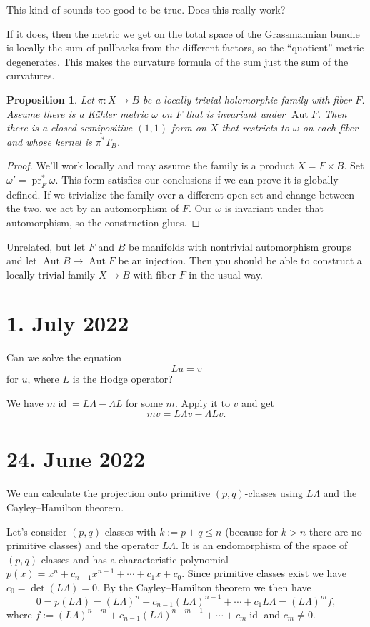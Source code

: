 \documentclass[11pt]{amsart}
\newtheorem{prop}[theo]{Proposition}
\theoremstyle{definition}
\DeclareMathOperator{\pr}{pr}
\DeclareMathOperator{\Aut}{Aut}
\DeclareMathOperator{\id}{id}
\begin{document}
This kind of sounds too good to be true. Does this really work?

If it does, then the metric we get on the total space of the Grassmannian bundle
is locally the sum of pullbacks from the different factors, so the ``quotient''
metric degenerates. This makes the curvature formula of the sum just the sum of
the curvatures.


\begin{prop}
Let $\pi : X \to B$ be a locally trivial holomorphic family with fiber $F$.
Assume there is a K\"ahler metric $\omega$ on $F$ that is invariant under $\Aut F$.
Then there is a closed semipositive $(1,1)$-form on $X$ that restricts to $\omega$ on each fiber and whose kernel is $\pi^*T_B$.
\end{prop}

\begin{proof}
We'll work locally and may assume the family is a product $X = F \times B$.
Set $\omega' = \pr_{F}^*\omega$.
This form satisfies our conclusions if we can prove it is globally defined.
If we trivialize the family over a different open set and change between the two, we act by an automorphism of $F$.
Our $\omega$ is invariant under that automorphism, so the construction glues.
\end{proof}


Unrelated, but let $F$ and $B$ be manifolds with nontrivial automorphism groups
and let $\Aut B \to \Aut F$ be an injection. Then you should be able to
construct a locally trivial family $X \to B$ with fiber $F$ in the usual way.


\section*{1. July 2022}

Can we solve the equation
\[
  Lu = v
\]
for $u$, where $L$ is the Hodge operator?

We have $m \id = L\Lambda - \Lambda L$ for some $m$. Apply it to $v$ and get
\[
  m v = L \Lambda v - \Lambda L v.
\]

\section*{24. June 2022}


We can calculate the projection onto primitive $(p,q)$-classes using $L\Lambda$ and the Cayley--Hamilton theorem.

Let's consider $(p,q)$-classes with $k := p + q \leq n$ (because for $k > n$ there are no primitive classes) and the operator $L\Lambda$. It is an endomorphism of the space of $(p,q)$-classes and has a characteristic polynomial $p(x) = x^n + c_{n-1}x^{n-1} + \cdots + c_1 x + c_0$. Since primitive classes exist we have $c_0 = \det (L\Lambda) = 0$. By the Cayley--Hamilton theorem we then have
$$
0 = p(L\Lambda)
= (L\Lambda)^n + c_{n-1}(L\Lambda)^{n-1} + \cdots + c_1 L\Lambda
= (L\Lambda)^m f,
$$
where $f := (L\Lambda)^{n-m} + c_{n-1} (L\Lambda)^{n-m-1} + \cdots + c_m \operatorname{id}$ and $c_m \not= 0$.
\end{document}
